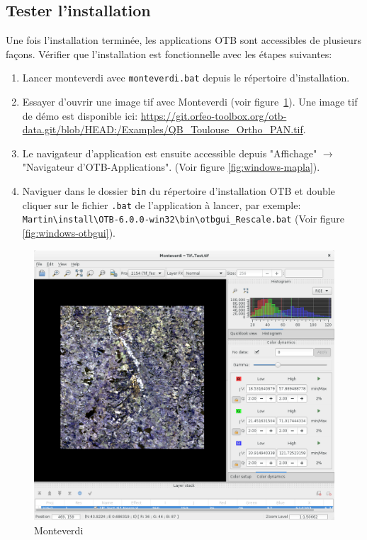\documentclass[10pt,a4paper]{article}
\begin{document}
\subsection{Tester l'installation}
Une fois l'installation terminée, les applications OTB sont accessibles de
plusieurs façons. Vérifier que l'installation est fonctionnelle avec les étapes
suivantes:
\begin{enumerate}

\item Lancer monteverdi avec \texttt{monteverdi.bat} depuis le répertoire
d'installation.

\item Essayer d'ouvrir une image tif avec Monteverdi (voir
figure~\ref{fig:monteverdi}). Une image tif de démo est
disponible ici: \url{https://git.orfeo-toolbox.org/otb-data.git/blob/HEAD:/Examples/QB\_Toulouse\_Ortho\_PAN.tif}.

\item Le navigateur d'application est ensuite accessible depuis "Affichage"
$\rightarrow$ "Navigateur d'OTB-Applications".
(Voir figure \ref{fig:windows-mapla}).

\item Naviguer dans le dossier \texttt{bin} du répertoire d'installation OTB et double cliquer sur le
fichier \texttt{.bat} de l'application à lancer, par exemple:\\
\texttt{Martin{\textbackslash}install{\textbackslash}OTB-6.0.0-win32{\textbackslash}bin{\textbackslash}otbgui\_Rescale.bat}
(Voir figure \ref{fig:windows-otbgui}).

\end{enumerate}

\begin{figure}[h]
  \center
  \includegraphics[width=1\textwidth]{Art/monteverdi-tif.png}
  \caption[]{Monteverdi}
  \label{fig:monteverdi}
\end{figure}
\end{document}
